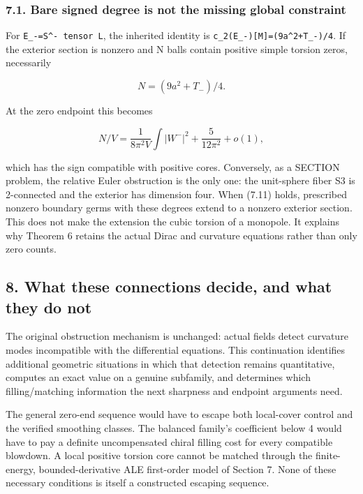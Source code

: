 \documentclass[
  10pt,
]{article}
\begin{document}
\hypertarget{bare-signed-degree-is-not-the-missing-global-constraint}{%
\subsubsection{7.1. Bare signed degree is not the missing global
constraint}\label{bare-signed-degree-is-not-the-missing-global-constraint}}

For \texttt{E\_-=S\^{}-\ tensor\ L}, the inherited identity is
\texttt{c\_2(E\_-){[}M{]}=(9a\^{}2+T\_-)/4}. If the exterior section is
nonzero and N balls contain positive simple torsion zeros, necessarily

\[
                     N=(9a^2+T_-)/4.                 \tag{7.11}
\]

At the zero endpoint this becomes

\[
  N/V=\frac1{8\pi^2V}\int|W^-|^2
                            +\frac5{12\pi^2}+o(1),   \tag{7.12}
\]

which has the sign compatible with positive cores. Conversely, as a
SECTION problem, the relative Euler obstruction is the only one: the
unit-sphere fiber S3 is 2-connected and the exterior has dimension four.
When (7.11) holds, prescribed nonzero boundary germs with these degrees
extend to a nonzero exterior section. This does not make the extension
the cubic torsion of a monopole. It explains why Theorem 6 retains the
actual Dirac and curvature equations rather than only zero counts.

\hypertarget{what-these-connections-decide-and-what-they-do-not}{%
\subsection{8. What these connections decide, and what they do
not}\label{what-these-connections-decide-and-what-they-do-not}}

The original obstruction mechanism is unchanged: actual fields detect
curvature modes incompatible with the differential equations. This
continuation identifies additional geometric situations in which that
detection remains quantitative, computes an exact value on a genuine
subfamily, and determines which filling/matching information the next
sharpness and endpoint arguments need.

The general zero-end sequence would have to escape both local-cover
control and the verified smoothing classes. The balanced family's
coefficient below 4 would have to pay a definite uncompensated chiral
filling cost for every compatible blowdown. A local positive torsion
core cannot be matched through the finite-energy, bounded-derivative ALE
first-order model of Section 7. None of these necessary conditions is
itself a constructed escaping sequence.
\end{document}
